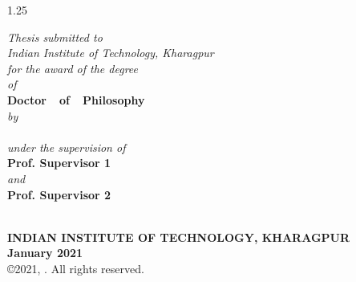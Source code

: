 \thispagestyle{plain}
\begin{center}
\begin{spacing} {1.25}
{\LARGE \bf \thesisTitle}
\end{spacing}

\vspace*{2.0cm} {\em Thesis submitted to\\ Indian Institute of Technology, Kharagpur \\ 
for the award of the degree}\\
{\em of} \\
\vspace*{0.3cm}
{\Large {\bf Doctor\ \ of\ \ Philosophy}}\\
\vspace*{0.3cm}
{\em by}\\
\vspace*{0.3cm}
{\Large{\bf \authorName}}\\
\vspace*{0.3cm}
{\em under the supervision of }\\
\vspace*{0.2cm}
{\bf Prof. Supervisor 1}\\
\vspace*{0.1cm}
{\em and }\\
\vspace*{0.1cm}
{\bf Prof. Supervisor 2}\\
\vspace*{1cm}
\begin{figure}[htbp]
  \centerline{}
\end{figure}
{{\bf \authorDept \\
INDIAN INSTITUTE OF TECHNOLOGY, KHARAGPUR\\
January 2021}} \\
\copyright 2021, \authorName. All rights reserved.
\end{center}
